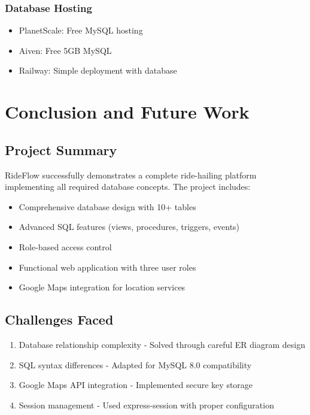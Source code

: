 \documentclass[12pt,a4paper]{report}
\begin{document}
\subsection{Database Hosting}
\begin{itemize}
    \item PlanetScale: Free MySQL hosting
    \item Aiven: Free 5GB MySQL
    \item Railway: Simple deployment with database
\end{itemize}

\chapter{Conclusion and Future Work}

\section{Project Summary}
RideFlow successfully demonstrates a complete ride-hailing platform implementing all required database concepts. The project includes:
\begin{itemize}
    \item Comprehensive database design with 10+ tables
    \item Advanced SQL features (views, procedures, triggers, events)
    \item Role-based access control
    \item Functional web application with three user roles
    \item Google Maps integration for location services
\end{itemize}

\section{Challenges Faced}
\begin{enumerate}
    \item Database relationship complexity - Solved through careful ER diagram design
    \item SQL syntax differences - Adapted for MySQL 8.0 compatibility
    \item Google Maps API integration - Implemented secure key storage
    \item Session management - Used express-session with proper configuration
\end{enumerate}
\end{document}

